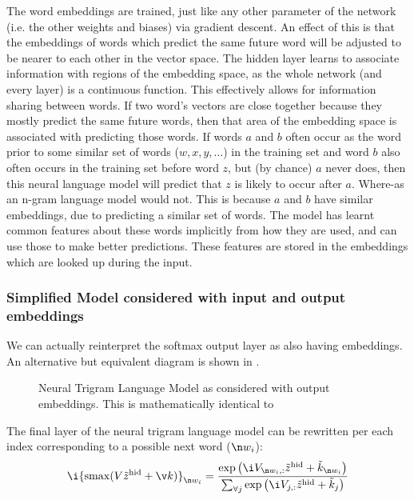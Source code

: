 {The word embeddings are trained, just like any other parameter of the network (i.e. the other weights and biases) via gradient descent.
An effect of this is that the embeddings of words which predict the same future word will be adjusted to be nearer to each other in the vector space.
The hidden layer learns to associate information with regions of the embedding space, as the whole network (and every layer) is a continuous function.
This effectively allows for information sharing between words.
If two word's vectors are close together because they mostly predict the same future words, then that area of the embedding space is associated with predicting those words.
If words $a$ and $b$  often occur as the word prior to some similar set of words ($w,x,y,\ldots$) in the training set
and word $b$ also often occurs in the training set before word $z$, but (by chance) $a$ never does,
then this neural language model will predict that $z$ is likely to occur after $a$.
Where-as an n-gram language model would not.
This is because $a$ and $b$ have similar embeddings, due to predicting a similar set of words.
The model has learnt common features about these words implicitly from how they are used, and can use those to make better predictions.
These features are stored in the embeddings which are looked up during the input.

\subsubsection{Simplified Model considered with input and output embeddings}
We can actually reinterpret the softmax output layer as also having embeddings.
An alternative but equivalent diagram is shown in .

\begin{figure}
	\caption{Neural Trigram Language Model as considered with output embeddings. This is mathematically identical to }
	\label{fig:trigram-adv-neural-language-model}
	\centering
	 
\end{figure}

The final layer of the neural trigram language model can be rewritten per each index corresponding to a possible next word ($\n w_i$):
\begin{equation}
\i {\softmax(V \dv z_{hid}+ \v k)}_{\n w_i} = \dfrac{\exp{\i V_{\n w_i,:} \dv z_{hid}+\iv k_{\n w_i}}}{\sum_{\forall j}\exp{\i V_{j,:} \dv z_{hid}+\iv k_{j}}}
\end{equation} 


}
